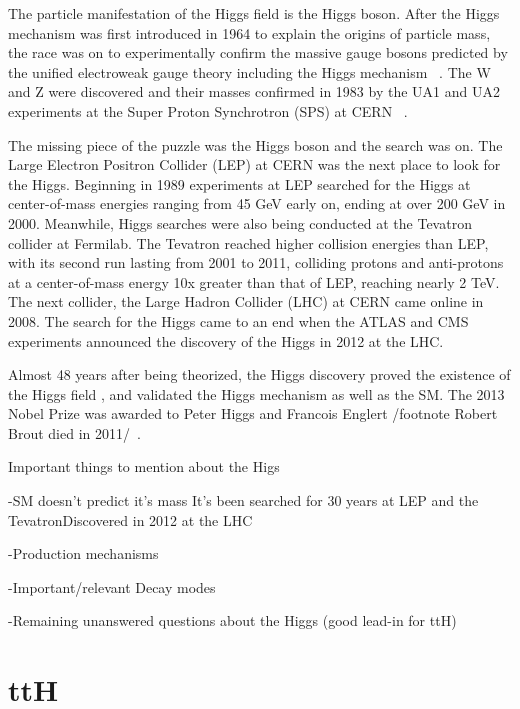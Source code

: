 The particle manifestation of the Higgs field is the Higgs boson. After the Higgs mechanism was first introduced in 1964 to explain the origins of particle mass,
the race was on to experimentally confirm the massive gauge bosons predicted by the unified electroweak gauge theory including the Higgs mechanism ~\cite{higgs}.
The W and Z were discovered and their masses confirmed in 1983 by the UA1 and UA2 experiments at the Super Proton Synchrotron (SPS) at CERN ~\cite{WandZdiscoveries}.

The missing piece of the puzzle was the Higgs boson and the search was on. The Large Electron Positron Collider (LEP) at CERN was the next place to look for the Higgs.
Beginning in 1989 experiments at LEP searched for the Higgs at center-of-mass energies ranging from 45 GeV early on, ending at over 200 GeV in 2000. Meanwhile, Higgs
searches were also being conducted at the Tevatron collider at Fermilab. The Tevatron reached higher collision energies than LEP, with its second run lasting from 2001
to 2011, colliding protons and anti-protons at a center-of-mass energy 10x greater than that of LEP, reaching nearly 2 TeV. The next collider, the Large Hadron Collider
(LHC) at CERN came online in 2008. The search for the Higgs came to an end when the ATLAS and CMS experiments announced the discovery of the Higgs in 2012 at the LHC. 

Almost 48 years after being theorized, the Higgs discovery proved the existence
of the Higgs field , and validated the Higgs mechanism as well as the SM. The 2013 Nobel Prize was awarded to Peter Higgs and Francois Englert
/footnote Robert Brout died in 2011/~\cite{NP13}.

Important things to mention about the Higs

-SM doesn't predict it's mass It's been searched for 30 years at LEP and the TevatronDiscovered in 2012 at the LHC

-Production mechanisms

-Important/relevant Decay modes

-Remaining unanswered questions about the Higgs (good lead-in for ttH)

\section{ttH}


%
% 
% 
